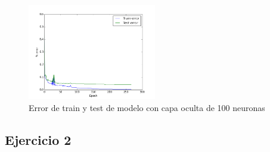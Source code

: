 \documentclass[11pt,spanish]{article}
\begin{document}
\begin{figure}[htbp]
	\centering
	\includegraphics[width=0.5\textwidth]{../ex1b3.png}
	\caption{Error de train y test de modelo con capa oculta de 100 neuronas}
	\label{ex1b3}
\end{figure}
\subsection*{Ejercicio 2}
\end{document}
